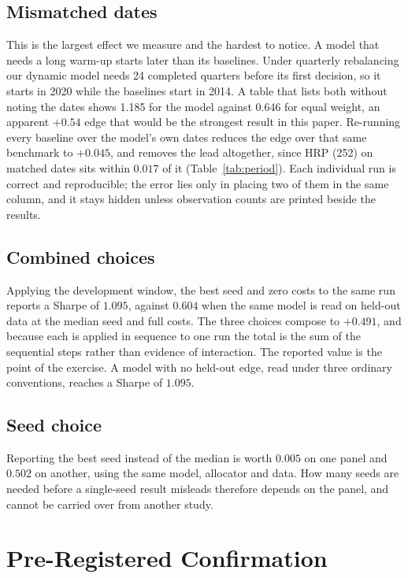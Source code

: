 \documentclass[sigconf,nonacm]{acmart}
\begin{document}
\subsection{Mismatched dates}
This is the largest effect we measure and the
hardest to notice. A model that needs a long warm-up starts later than its
baselines. Under quarterly
rebalancing our dynamic model needs 24 completed quarters before its first
decision, so it starts in 2020 while the baselines start in 2014. A table that lists both
without noting the dates shows 1.185 for the model against 0.646 for equal
weight, an apparent $+0.54$ edge that would be the strongest result in this
paper. Re-running every baseline over
the model's own dates reduces the edge over that same benchmark to $+0.045$, and
removes the lead altogether, since HRP (252) on matched dates sits within
$0.017$ of it
(Table~\ref{tab:period}). Each individual run is correct and reproducible; the
error lies only in placing two of them in the same column, and it stays hidden
unless observation counts are printed beside the results.

\subsection{Combined choices}
Applying the development window, the best seed
and zero costs to the same run reports a Sharpe of $1.095$, against $0.604$ when
the same model is read on held-out data at the median seed and full costs. The three choices compose to $+0.491$,
and because each is applied in sequence to one run the total is the sum of the
sequential steps rather than evidence of interaction. The reported value is the
point of the exercise. A model with no held-out edge, read under three ordinary
conventions, reaches a Sharpe of $1.095$.

\subsection{Seed choice}
Reporting the
best seed instead of the median is worth $0.005$ on one panel and $0.502$ on
another, using the same model, allocator and data. How many seeds are needed
before a single-seed result misleads therefore depends on the panel, and cannot
be carried over from another study.

\section{Pre-Registered Confirmation}
\label{sec:confirmation}
\end{document}
